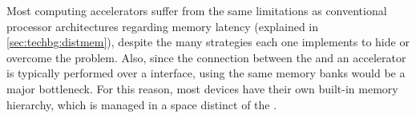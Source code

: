 \documentclass[../thesis]{subfiles}
\begin{document}
	Most computing accelerators suffer from the same limitations as conventional processor architectures regarding memory latency (explained in \cref{sec:techbg:distmem}), despite the many strategies each one implements to hide or overcome the problem. Also, since the connection between the \cpu and an accelerator is typically performed over a \pcie interface, using the same memory banks would be a major bottleneck. For this reason, most devices have their own built-in memory hierarchy, which is managed in a space distinct of the \cpus.
\end{document}

